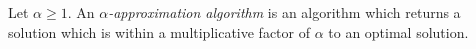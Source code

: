 \documentclass[a4paper,fleqn]{cas-sc}
\theoremstyle{remark}
\theoremstyle{plain}
\newcommand{\defn}[1]{\emph{#1}}
\begin{document}
Let $\alpha \geq 1$.  An \defn{$\alpha$-approximation algorithm} is an algorithm which returns a solution which is within a multiplicative factor of $\alpha$ to an optimal solution.  



\end{document}
